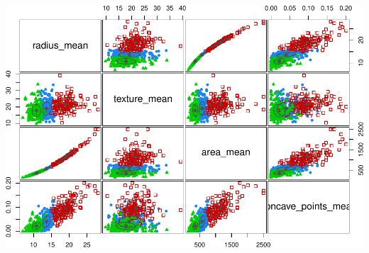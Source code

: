 \documentclass[12pt]{article}
\begin{document}
\includegraphics{ProjectDraftForPeer_files/figure-latex/unnamed-chunk-8-1.pdf}


\renewcommand\refname{Conclusion}

\end{document}
